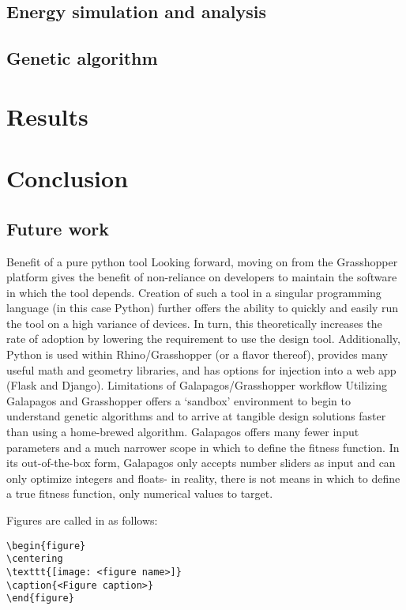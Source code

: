 \documentclass[sagev,times,Review]{sagej}
\begin{document}
\subsection{Energy simulation and analysis}
\subsection{Genetic algorithm}

\section{Results}

\section{Conclusion}

\subsection{Future work}
Benefit of a pure python tool 
Looking forward, moving on from the Grasshopper platform gives the benefit of non-reliance on developers to maintain the software in which the tool depends. Creation of such a tool in a singular programming language (in this case Python) further offers the ability to quickly and easily run the tool on a high variance of devices. In turn, this theoretically increases the rate of adoption by lowering the requirement to use the design tool. Additionally, Python is used within Rhino/Grasshopper (or a flavor thereof), provides many useful math and geometry libraries, and has options for injection into a web app (Flask and Django).
Limitations of Galapagos/Grasshopper workflow
Utilizing Galapagos and Grasshopper offers a ‘sandbox’ environment to begin to understand genetic algorithms and to arrive at tangible design solutions faster than using a home-brewed algorithm. Galapagos offers many fewer input parameters and a much narrower scope in which to define the fitness function. In its out-of-the-box form, Galapagos only accepts number sliders as input and can only optimize integers and floats- in reality, there is not means in which to define a true fitness function, only numerical values to target. 


Figures are called in as follows:
\begin{verbatim}
\begin{figure}
\centering
\texttt{[image: <figure name>]}
\caption{<Figure caption>}
\end{figure}
\end{verbatim}
\end{document}
